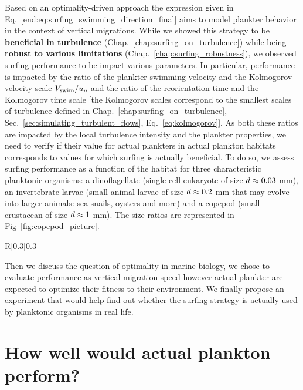 Based on an optimality-driven approach the expression given in Eq.~\ref{end:eq:surfing_swimming_direction_final} aims to model plankter behavior in the context of vertical migrations.
While we showed this strategy to be \textbf{beneficial in turbulence} (Chap.~\ref{chap:surfing_on_turbulence}) while being \textbf{robust to various limitations} (Chap.~\ref{chap:surfing_robustness}), we observed surfing performance to be impact various parameters. 
In particular, performance is impacted by the ratio of the plankter swimming velocity and the Kolmogorov velocity scale $V_{\mathrm{swim}}/u_{\eta}$ and the ratio of the reorientation time and the Kolmogorov time scale [the Kolmogorov scales correspond to the smallest scales of turbulence defined in Chap.~\ref{chap:surfing_on_turbulence}, Sec.~\ref{sec:simulating_turbulent_flows}, Eq.~\eqref{eq:kolmogorov}].
As both these ratios are impacted by the local turbulence intensity and the plankter properties, we need to verify if their value for actual plankters in actual plankton habitats corresponds to values for which surfing is actually beneficial.
To do so, we assess surfing performance as a function of the habitat for three characteristic planktonic organisms: a dinoflagellate (single cell eukaryote of size $d \approx 0.03$ mm), an invertebrate larvae (small animal larvae of size $d \approx 0.2$ mm that may evolve into larger animals: sea snails, oysters and more) and a copepod (small crustacean of size $d \approx 1$ mm).
The size ratios are represented in Fig~\ref{fig:copepod_picture}.
\begin{wrapfigure}[13]{R}[0.3\width]{0.3\textwidth}
	\vspace{0pt}
	\centering
	\def\svgwidth{0.25\textwidth}
	
	\captionsetup{width=0.25\textwidth}
  	\caption{
  		Visual representation of the size ratios of the typical plankters we consider.
  	}
  	\label{fig:copepod_picture}
\end{wrapfigure}
Then we discuss the question of optimality in marine biology, we chose to evaluate performance as vertical migration speed however actual plankter are expected to optimize their fitness to their environment.
We finally propose an experiment that would help find out whether the surfing strategy is actually used by planktonic organisms in real life.

\section{How well would actual plankton perform?}\label{sec:how_plankton_perform}

